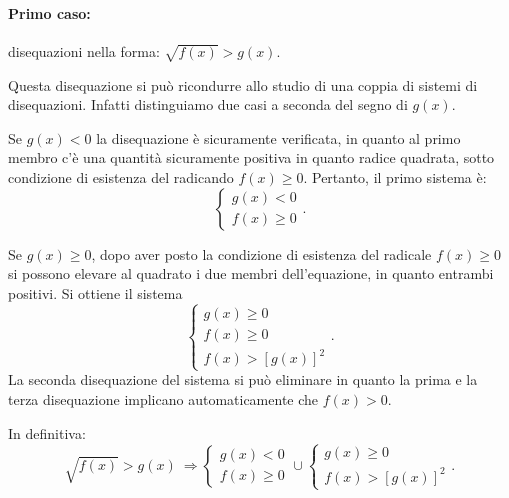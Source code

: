 \paragraph{Primo caso:} disequazioni nella forma: $\sqrt{f(x)}>g(x)$.

Questa disequazione si può ricondurre allo studio di una coppia di sistemi di disequazioni. Infatti distinguiamo due casi a seconda del segno di $g(x)$.

\begin{itemize*}
\item Se $ g(x)<0 $ la disequazione è sicuramente verificata, in quanto al primo membro c'è una quantità sicuramente positiva in quanto radice quadrata, sotto condizione di esistenza del radicando $f(x)\ge 0$. Pertanto, il primo sistema è: 
\[\left\{\begin{array}{l}{g(x)<0}\\{f(x)\ge 0}\end{array}\right..\]
\item Se $g(x)\ge 0$, dopo aver posto la condizione di esistenza del radicale $f(x)\ge 0$ si possono elevare al quadrato i due membri dell'equazione, in quanto entrambi positivi. Si ottiene il sistema 
\[\left\{\begin{array}{l}g(x)\ge 0\\f(x)\ge 0 \\f(x)>\left[g(x)\right]^2 \end{array}\right..\]
La seconda disequazione del sistema si può eliminare in quanto la prima e la terza disequazione implicano automaticamente che $f(x)>0$.
\end{itemize*}

In definitiva:
\[\sqrt{f(x)}>g(x) \:\Rightarrow \left\{\begin{array}{l}{g(x)<0}\\{f(x)\ge 0}\end{array}\right.\cup \left\{\begin{array}{l}g(x)\ge 0\\f(x)>\left[g(x)\right]^2\end{array}\right..\]

